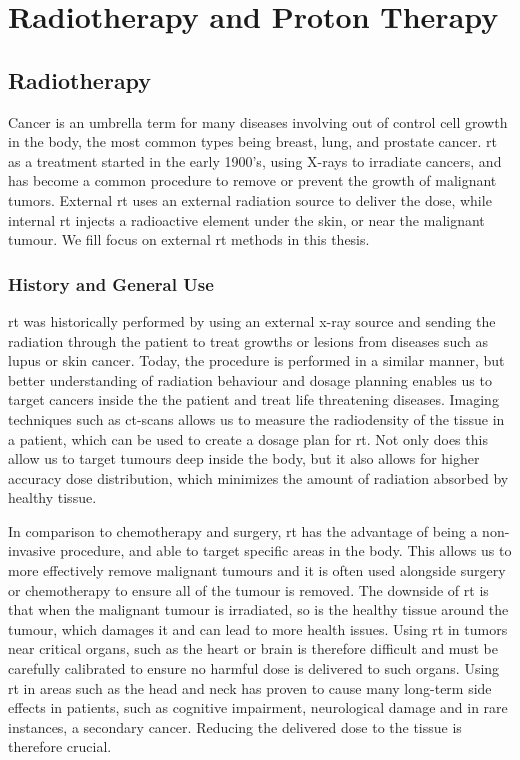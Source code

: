 \documentclass[main.tex]{subfiles}
\begin{document}
\section{Radiotherapy and Proton Therapy}

\subsection{Radiotherapy}

 Cancer is an umbrella term for many diseases involving out of control cell growth in the body, the most common types being breast, lung, and prostate cancer\cite{cancerData}. \gls{rt} as a treatment started in the early 1900's, using X-rays to irradiate cancers, and has become a common procedure to remove or prevent the growth of malignant tumors. External \gls{rt} uses an external radiation source to deliver the dose, while internal \gls{rt} injects a radioactive element under the skin, or near the malignant tumour. We fill focus on external \gls{rt} methods in this thesis.
 
 \subsubsection{History and General Use}
 
 \gls{rt} was historically performed by using an external x-ray source and sending the radiation through the patient to treat growths or lesions from diseases such as lupus or skin cancer. Today, the procedure is performed in a similar manner, but better understanding of radiation behaviour and dosage planning enables us to target cancers inside the the patient and treat life threatening diseases. Imaging techniques such as \gls{ct}-scans allows us to measure the radiodensity of the tissue in a patient, which can be used to create a dosage plan for \gls{rt}. Not only does this allow us to target tumours deep inside the body, but it also allows for higher accuracy dose distribution, which minimizes the amount of radiation absorbed by healthy tissue.
 
 In comparison to chemotherapy and surgery, \gls{rt} has the advantage of being a non-invasive procedure, and able to target specific areas in the body. This allows us to more effectively remove malignant tumours and it is often used alongside surgery or chemotherapy to ensure all of the tumour is removed. The downside of \gls{rt} is that when the malignant tumour is irradiated, so is the healthy tissue around the tumour, which damages it and can lead to more health issues. Using \gls{rt} in tumors near critical organs, such as the heart or brain is therefore difficult and must be carefully calibrated to ensure no harmful dose is delivered to such organs. Using \gls{rt} in areas such as the head and neck has proven to cause many long-term side effects in patients, such as cognitive impairment, neurological damage and in rare instances, a secondary cancer\cite{headRTData}. Reducing the delivered dose to the tissue is therefore crucial.
 
\end{document}
